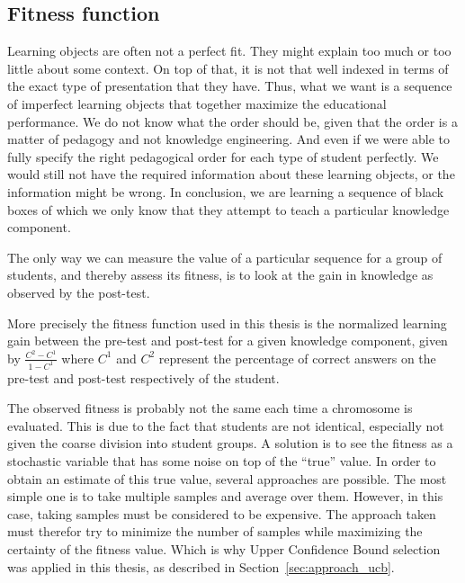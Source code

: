 \subsection{Fitness function}
Learning objects are often not a perfect fit. They might explain too much or too
little about some context. On top of that, it is not that well indexed in terms of the
exact type of presentation that they have. Thus, what we want is a
sequence of imperfect learning objects that together maximize the
educational performance. We do not know what the order should be, given
that the order is a matter of pedagogy and not knowledge engineering.
And even if we were able to fully specify the right pedagogical order
for each type of student perfectly. We would still not have the
required information about these learning objects, or the information
might be wrong. In conclusion, we are learning a sequence of black
boxes of which we only know that they attempt to teach a particular
knowledge component.

The only way we can measure the value of a particular sequence for a
group of students, and thereby assess its fitness, is to look at the
gain in knowledge as observed by the post-test.

More precisely the fitness function used in this thesis is the normalized
learning gain between the pre-test and post-test for a given knowledge component,
given by $\frac{C^2 - C^1}{1-C^1}$ where $C^1$ and $C^2$
represent the percentage of correct answers on the pre-test and post-test
respectively of the student.

The observed fitness is probably not the same each time a chromosome
is evaluated. This is due to the fact that students are not identical,
especially not given the coarse division into student groups. A solution
is to see the fitness as a stochastic variable that has some noise on
top of the ``true'' value. In order to obtain an estimate of this true
value, several approaches are possible. The most simple one is to take
multiple samples and average over them. However, in this case, taking
samples must be considered to be expensive. The approach taken must
therefor try to minimize the number of samples while maximizing the
certainty of the fitness value. Which is why Upper Confidence Bound selection
was applied in this thesis, as described in Section~\ref{sec:approach_ucb}.

